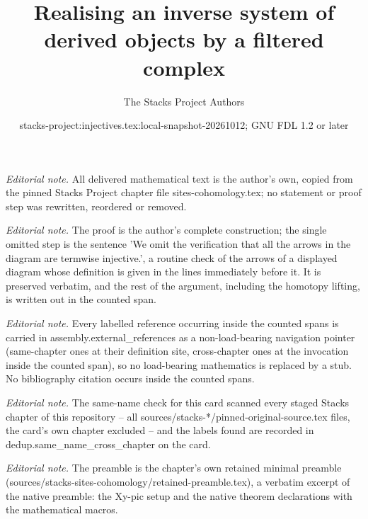 \documentclass[10pt,a4paper]{amsart}
\title{Realising an inverse system of derived objects by a filtered complex}
\author{The Stacks Project Authors}
\date{stacks-project:injectives.tex:local-snapshot-20261012; GNU FDL 1.2 or later}
\theoremstyle{plain}
\theoremstyle{definition}
\theoremstyle{remark}
\numberwithin{equation}{subsection}
\begin{document}
\maketitle
\noindent\textit{Editorial note.} All delivered mathematical text is the author's own, copied from the pinned Stacks Project chapter file sites-cohomology.tex; no statement or proof step was rewritten, reordered or removed.\par\medskip
\noindent\textit{Editorial note.} The proof is the author's complete construction; the single omitted step is the sentence 'We omit the verification that all the arrows in the diagram are termwise injective.', a routine check of the arrows of a displayed diagram whose definition is given in the lines immediately before it. It is preserved verbatim, and the rest of the argument, including the homotopy lifting, is written out in the counted span.\par\medskip
\noindent\textit{Editorial note.} Every labelled reference occurring inside the counted spans is carried in assembly.external\_references as a non-load-bearing navigation pointer (same-chapter ones at their definition site, cross-chapter ones at the invocation inside the counted span), so no load-bearing mathematics is replaced by a stub. No bibliography citation occurs inside the counted spans.\par\medskip
\noindent\textit{Editorial note.} The same-name check for this card scanned every staged Stacks chapter of this repository -- all sources/stacks-*/pinned-original-source.tex files, the card's own chapter excluded -- and the labels found are recorded in dedup.same\_name\_cross\_chapter on the card.\par\medskip
\noindent\textit{Editorial note.} The preamble is the chapter's own retained minimal preamble (sources/stacks-sites-cohomology/retained-preamble.tex), a verbatim excerpt of the native preamble: the Xy-pic setup and the native theorem declarations with the mathematical macros.\par\medskip
\end{document}
